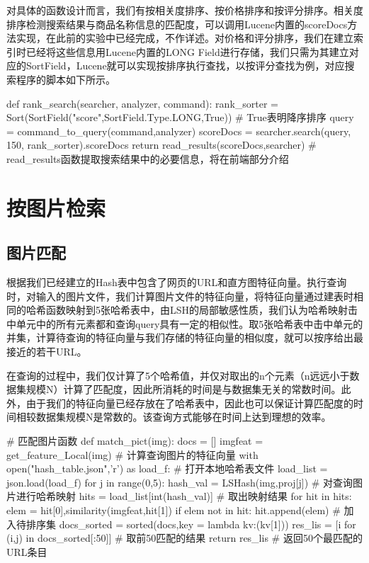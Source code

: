 对具体的函数设计而言，我们有按相关度排序、按价格排序和按评分排序。相关度排序检测搜索结果与商品名称信息的匹配度，可以调用Lucene内置的scoreDocs方法实现，在此前的实验中已经完成，不作详述。对价格和评分排序，我们在建立索引时已经将这些信息用Lucene内置的LONG Field进行存储，我们只需为其建立对应的SortField，Lucene就可以实现按排序执行查找，以按评分查找为例，对应搜索程序的脚本如下所示。

\begin{python}
def rank_search(searcher, analyzer, command):
    rank_sorter = Sort(SortField("score",SortField.Type.LONG,True))  # True表明降序排序
    query = command_to_query(command,analyzer)
    scoreDocs = searcher.search(query, 150, rank_sorter).scoreDocs
    return read_results(scoreDocs,searcher) 
    # read_results函数提取搜索结果中的必要信息，将在前端部分介绍
\end{python}

\section{按图片检索}

\subsection{图片匹配}
根据我们已经建立的Hash表中包含了网页的URL和直方图特征向量。执行查询时，对输入的图片文件，我们计算图片文件的特征向量，将特征向量通过建表时相同的哈希函数映射到5张哈希表中，由LSH的局部敏感性质，我们认为哈希映射击中单元中的所有元素都和查询query具有一定的相似性。取5张哈希表中击中单元的并集，计算待查询的特征向量与我们存储的特征向量的相似度，就可以按序给出最接近的若干URL。

在查询的过程中，我们仅计算了5个哈希值，并仅对取出的n个元素（n远远小于数据集规模N）计算了匹配度，因此所消耗的时间是与数据集无关的常数时间。此外，由于我们的特征向量已经存放在了哈希表中，因此也可以保证计算匹配度的时间相较数据集规模N是常数的。该查询方式能够在时间上达到理想的效率。

\begin{python}
# 匹配图片函数
def match_pict(img):
    docs = []
    imgfeat = get_feature_Local(img)             # 计算查询图片的特征向量
    with open("hash_table.json",'r') as load_f:  # 打开本地哈希表文件
        load_list = json.load(load_f)
        for j in range(0,5):
            hash_val = LSHash(img,proj[j])       # 对查询图片进行哈希映射
            hits = load_list[int(hash_val)]      # 取出映射结果
            for hit in hits:
                elem = hit[0],similarity(imgfeat,hit[1])
                if elem not in hit:
                    hit.append(elem)             # 加入待排序集
    docs_sorted = sorted(docs,key = lambda kv:(kv[1]))
    res_lis = [i for (i,j) in docs_sorted[:50]]  # 取前50匹配的结果
    return res_lis                               # 返回50个最匹配的URL条目
\end{python}

